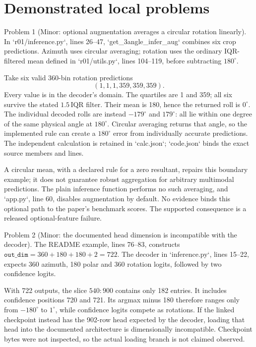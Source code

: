 \documentclass[10pt]{article}
\begin{document}
\section*{Demonstrated local problems}
Problem 1 (Minor: optional augmentation averages a circular rotation linearly).  In `r01/inference.py`, lines 26–47, `get\_3angle\_infer\_aug` combines six crop predictions. Azimuth uses circular averaging; rotation uses the ordinary IQR-filtered mean defined in `r01/utils.py`, lines 104–119, before subtracting \(180^\circ\).\par
Take six valid 360-bin rotation predictions \[(1,1,1,359,359,359).\] Every value is in the decoder’s domain. The quartiles are 1 and 359; all six survive the stated \(1.5\,\mathrm{IQR}\) filter. Their mean is 180, hence the returned roll is \(0^\circ\). The individual decoded rolls are instead \(-179^\circ\) and \(179^\circ\): all lie within one degree of the same physical angle at \(180^\circ\). Circular averaging returns that angle, so the implemented rule can create a \(180^\circ\) error from individually accurate predictions. The independent calculation is retained in `calc.json`; `code.json` binds the exact source members and lines.\par
A circular mean, with a declared rule for a zero resultant, repairs this boundary example; it does not guarantee robust aggregation for arbitrary multimodal predictions. The plain inference function performs no such averaging, and `app.py`, line 60, disables augmentation by default. No evidence binds this optional path to the paper’s benchmark scores. The supported consequence is a released optional-feature failure.\par
Problem 2 (Minor: the documented head dimension is incompatible with the decoder).  The README example, lines 76–83, constructs \(\texttt{out\_dim}=360+180+180+2=722\). The decoder in `inference.py`, lines 15–22, expects 360 azimuth, 180 polar and 360 rotation logits, followed by two confidence logits.\par
With 722 outputs, the slice \(540{:}900\) contains only 182 entries. It includes confidence positions 720 and 721. Its argmax minus 180 therefore ranges only from \(-180^\circ\) to \(1^\circ\), while confidence logits compete as rotations. If the linked checkpoint instead has the 902-row head expected by the decoder, loading that head into the documented architecture is dimensionally incompatible. Checkpoint bytes were not inspected, so the actual loading branch is not claimed observed.\par
\end{document}
